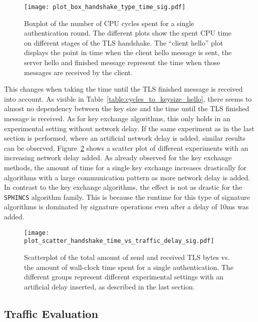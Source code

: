 \begin{figure}[h!t]
    \centering\texttt{[image: plot\_box\_handshake\_type\_time\_sig.pdf]}
    \caption{Boxplot of the number of CPU cycles spent for a single authentication round. The different plots show the spent \acs{CPU} time on different stages of the TLS handshake. The ``client hello'' plot displays the point in time when the client hello message is sent, the server hello and finished message represent the time when those messages are received by the client.}\label{fig:plot_box_handshake_type_time_sig.pdf} 
\end{figure}


This changes when taking the time until the TLS finished message is received into account. As visible in Table~\ref{table:cycles_to_keysize_hello}, there seems to almost no dependency between the key size and the time until the TLS finished message is received. As for key exchange algorithms, this only holds in an experimental setting without network delay. If the same experiment as in the last section is performed, where an artificial network delay is added, similar results can be observed. Figure~\ref{fig:plot_scatter_handshake_time_vs_traffic_delay_sig.pdf} shows a scatter plot of different experiments with an increasing network delay added. As already observed for the key exchange methods, the amount of time for a single key exchange increases drastically for algorithms with a large communication pattern as more network delay is added. In contrast to the key exchange algorithms, the effect is not as drastic for the \texttt{SPHINCS} algorithm family. This is because the runtime for this type of signature algorithms is dominated by signature operations even after a delay of 10ms was added. 


\begin{figure}[ht]
    \centering\texttt{[image: plot\_scatter\_handshake\_time\_vs\_traffic\_delay\_sig.pdf]}
    \caption{Scatterplot of the total amount of send and received TLS bytes vs. the amount of wall-clock time spent for a single authentication. The different groups represent different experimental settings with an artificial delay inserted, as described in the last section.}\label{fig:plot_scatter_handshake_time_vs_traffic_delay_sig.pdf}
\end{figure}

\subsection{Traffic Evaluation}

